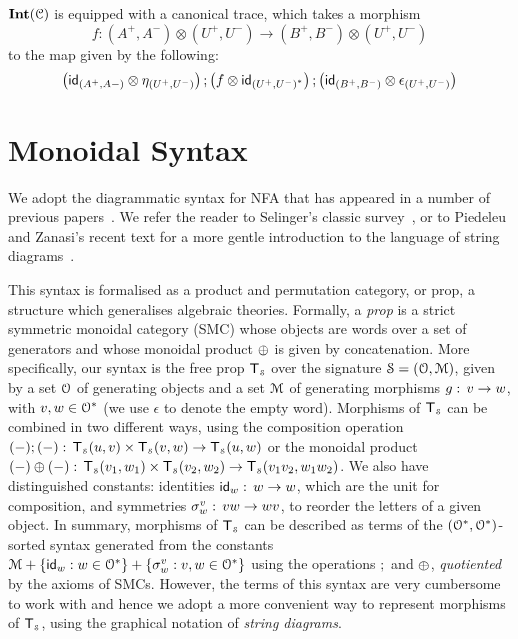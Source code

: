	$\mathbf{Int}(\mathcal{C})$ is equipped with a canonical trace, which takes a morphism $$f \colon (A^+, A^-) \otimes (U^+, U^-) \to (B^+, B^-) \otimes (U^+, U^-)$$ to the map given by the following:
	\[
	\left(\mathsf{id}_{(A^+, A-)} \otimes \eta_{(U^+, U^-)}\right) ;\left(f \otimes \mathsf{id}_{{(U^+, U^-)}^\ast}\right); \left(\mathsf{id}_{(B^+, B^-)} \otimes \epsilon_{(U^+, U^-)}  \right)
	\]
	
	\section{Monoidal Syntax}\label{c3:sec:monoidal}
We adopt the diagrammatic syntax for NFA that has appeared in a number of previous papers~\cite{piedeleu2023finite,antoinecsl2025}. 
We refer the reader to Selinger's classic survey~\cite{Selinger_2010}, or to Piedeleu and Zanasi's recent text for a more gentle introduction to the language of string diagrams~\cite{piedeleu2023introduction}.

This syntax is formalised as a product and permutation category, or prop, a structure which generalises algebraic theories. Formally, a \emph{prop} is a strict symmetric monoidal category (SMC) whose objects are words over a set of generators and whose monoidal product $\oplus$ is given by concatenation. 
More specifically, our syntax is the free prop $\mathsf{T}_{\scriptscriptstyle \mathcal{S}}$ over the signature $\mathcal{S} = (\mathcal{O},\mathcal{M})$, given by a set $\mathcal{O}$ of generating objects and a set $\mathcal{M}$  of generating morphisms $g\mathrel{:}\, v\to w$, with $v,w\in \mathcal{O}^*$ (we use $\epsilon$ to denote the empty word). Morphisms of  $\mathsf{T}_{\scriptscriptstyle \mathcal{S}}$ can be combined in two different ways, using the composition operation $(-);(-)\mathrel{:}\, \mathsf{T}_{\scriptscriptstyle \mathcal{S}}(u,v)\times \mathsf{T}_{\scriptscriptstyle \mathcal{S}}(v,w)\to \mathsf{T}_{\scriptscriptstyle \mathcal{S}}(u,w)$ or the monoidal product $(-)\oplus(-)\mathrel{:}\, \mathsf{T}_{\scriptscriptstyle \mathcal{S}}(v_1,w_1)\times \mathsf{T}_{\scriptscriptstyle \mathcal{S}}(v_2,w_2)\to \mathsf{T}_{\scriptscriptstyle \mathcal{S}}(v_1 v_2,w_1 w_2)$. We also have distinguished constants: identities $\mathsf{id}_w\mathrel{:}\, w\to w$, which are the unit for composition, and symmetries $\sigma^v_w\mathrel{:}\, vw\to wv$, to reorder the letters of a given object. In summary, morphisms of $\mathsf{T}_{\scriptscriptstyle \mathcal{S}}$ can be described as terms of the $(\mathcal{O}^*,\mathcal{O}^*)$-sorted syntax generated from the constants $\mathcal{M} + \{\mathsf{id}_w : w\in \mathcal{O}^*\}+ \{\sigma^v_w : v,w\in \mathcal{O}^*\}$ using the operations $;$ and $\oplus$, \emph{quotiented} by the axioms of SMCs. However, the terms of this syntax are very cumbersome to work with and hence we adopt a more convenient way to represent morphisms of $\mathsf{T}_{\scriptscriptstyle \mathcal{S}}$, using the graphical notation of \emph{string diagrams}. 

